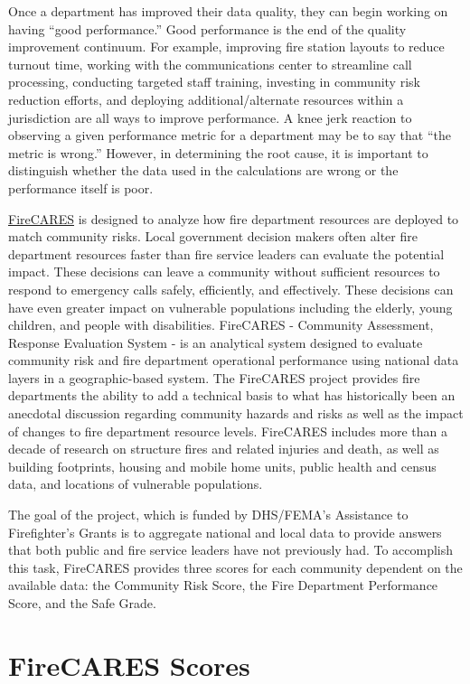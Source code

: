 \documentclass[12pt,oneside]{book}
\begin{document}
Once a department has improved their data quality, they can begin working on having ``good performance.'' Good performance is the end of the quality improvement continuum. For example, improving fire station layouts to reduce turnout time, working with the communications center to streamline call processing, conducting targeted staff training, investing in community risk reduction efforts, and deploying additional/alternate resources within a jurisdiction are all ways to improve performance. 
A knee jerk reaction to observing a given performance metric for a department may be to say that ``the metric is wrong.'' However, in determining the root cause, it is important to distinguish whether the data used in the calculations are wrong or the performance itself is poor.  

\href{https://firecares.org}{FireCARES} is designed to analyze how fire department resources are deployed to match community risks. Local government decision makers often alter fire department resources faster than fire service leaders can evaluate the potential impact. These decisions can leave a community without sufficient resources to respond to emergency calls safely, efficiently, and effectively. These decisions can have even greater impact on vulnerable populations including the elderly, young children, and people with disabilities. FireCARES - Community Assessment, Response Evaluation System - is an analytical system designed to evaluate community risk and fire department operational performance using national data layers in a geographic-based system. The FireCARES project provides fire departments the ability to add a technical basis to what has historically been an anecdotal discussion regarding community hazards and risks as well as the impact of changes to fire department resource levels. FireCARES includes more than a decade of research on structure fires and related injuries and death, as well as building footprints, housing and mobile home units, public health and census data, and locations of vulnerable populations.

The goal of the project, which is funded by DHS/FEMA's Assistance to Firefighter's Grants is to aggregate national and local data to provide answers that both public and fire service leaders have not previously had. To accomplish this task, FireCARES provides three scores for each community dependent on the available data: the Community Risk Score, the Fire Department Performance Score, and the Safe Grade.

\chapter{FireCARES Scores}
\end{document}
